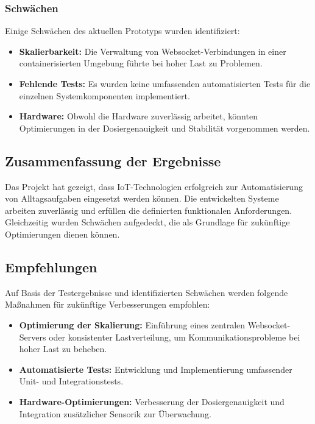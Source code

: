\subsubsection*{Schwächen}

Einige Schwächen des aktuellen Prototyps wurden identifiziert:
\begin{itemize}
  \item \textbf{Skalierbarkeit:} Die Verwaltung von Websocket-Verbindungen in einer 
  containerisierten Umgebung führte bei hoher Last zu Problemen.
  \item \textbf{Fehlende Tests:} Es wurden keine umfassenden automatisierten Tests für die einzelnen 
  Systemkomponenten implementiert.
  \item \textbf{Hardware:} Obwohl die Hardware zuverlässig arbeitet, könnten Optimierungen in der 
  Dosiergenauigkeit und Stabilität vorgenommen werden.
\end{itemize}

\subsection{Zusammenfassung der Ergebnisse}

Das Projekt hat gezeigt, dass IoT-Technologien erfolgreich zur Automatisierung von Alltagsaufgaben 
eingesetzt werden können. Die entwickelten Systeme arbeiten zuverlässig und erfüllen die definierten 
funktionalen Anforderungen. Gleichzeitig wurden Schwächen aufgedeckt, die als Grundlage für 
zukünftige Optimierungen dienen können.

\subsection{Empfehlungen}
Auf Basis der Testergebnisse und identifizierten Schwächen werden folgende Maßnahmen für zukünftige 
Verbesserungen empfohlen:
\begin{itemize}
  \item \textbf{Optimierung der Skalierung:} Einführung eines zentralen Websocket-Servers oder 
  konsistenter Lastverteilung, um Kommunikationsprobleme bei hoher Last zu beheben.
  \item \textbf{Automatisierte Tests:} Entwicklung und Implementierung umfassender \\
  Unit- und Integrationstests.
  \item \textbf{Hardware-Optimierungen:} Verbesserung der Dosiergenauigkeit und Integration 
  zusätzlicher Sensorik zur Überwachung.
\end{itemize}

